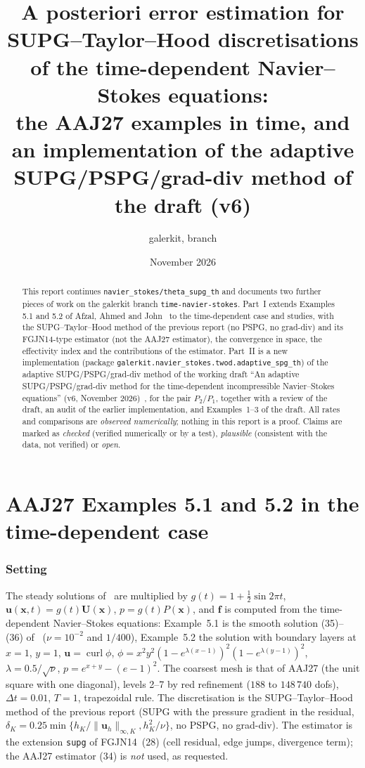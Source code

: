 \documentclass[11pt,a4paper]{article}
\title{A posteriori error estimation for SUPG--Taylor--Hood discretisations\\of the time-dependent Navier--Stokes equations:\\
the AAJ27 examples in time, and an implementation of the adaptive\\SUPG/PSPG/grad-div method of the draft (v6)}
\author{galerkit, branch \code{time-navier-stokes}}
\date{November 2026}
\newcommand{\bu}{\boldsymbol{u}}
\newcommand{\bff}{\boldsymbol{f}}
\newcommand{\dt}{\Delta t}
\newcommand{\code}[1]{\texttt{#1}}
\begin{document}
\maketitle

\begin{abstract}
This report continues \code{navier\_stokes/theta\_supg\_th} and documents two further pieces of work on the galerkit
branch \code{time-navier-stokes}. Part~I extends Examples 5.1 and 5.2 of Afzal, Ahmed and John~\cite{AAJ27} to the
time-dependent case and studies, with the SUPG--Taylor--Hood method of the previous report (no PSPG, no grad-div)
and its FGJN14-type estimator (not the AAJ27 estimator), the convergence in space, the effectivity index and the
contributions of the estimator. Part~II is a new implementation (package
\code{galerkit.\allowbreak navier\_stokes.\allowbreak twod.\allowbreak adaptive\_spg\_th}) of the adaptive
SUPG/PSPG/grad-div method of the working draft ``An adaptive SUPG/PSPG/grad-div method for the time-dependent
incompressible Navier--Stokes equations'' (v6, November 2026)~\cite{draft}, for the pair $P_2/P_1$, together with a
review of the draft, an audit of the earlier implementation, and Examples~1--3 of the draft.
All rates and comparisons are \emph{observed numerically}; nothing in this report is a proof. Claims are marked as
\emph{checked} (verified numerically or by a test), \emph{plausible} (consistent with the data, not verified) or
\emph{open}.
\end{abstract}

\tableofcontents

\part{AAJ27 Examples 5.1 and 5.2 in the time-dependent case}

\section{Setting}
The steady solutions of~\cite[Sect.~5]{AAJ27} are multiplied by $g(t)=1+\frac12\sin 2\pi t$, $\bu(\boldsymbol x,t)=g(t)\boldsymbol U(\boldsymbol x)$,
$p=g(t)P(\boldsymbol x)$, and $\bff$ is computed from the time-dependent Navier--Stokes equations:
Example~5.1 is the smooth solution (35)--(36) of~\cite{AAJ27} ($\nu=10^{-2}$ and $1/400$), Example~5.2 the solution with
boundary layers at $x=1$, $y=1$, $\bu=\operatorname{curl}\phi$, $\phi=x^2y^2(1-e^{\lambda(x-1)})^2(1-e^{\lambda(y-1)})^2$,
$\lambda=0.5/\sqrt\nu$, $p=e^{x+y}-(e-1)^2$. The coarsest mesh is that of AAJ27 (the unit square with one diagonal),
levels 2--7 by red refinement ($188$ to $148\,740$ dofs), $\dt=0.01$, $T=1$, trapezoidal rule.
The discretisation is the SUPG--Taylor--Hood method of the previous report (SUPG with the pressure gradient in the
residual, $\delta_K=0.25\min\{h_K/\|\bu_h\|_{\infty,K},h_K^2/\nu\}$, no PSPG, no grad-div).
The estimator is the extension \code{supg} of FGJN14~(28) (cell residual, edge jumps, divergence term); the AAJ27
estimator (34) is \emph{not} used, as requested.
\end{document}

